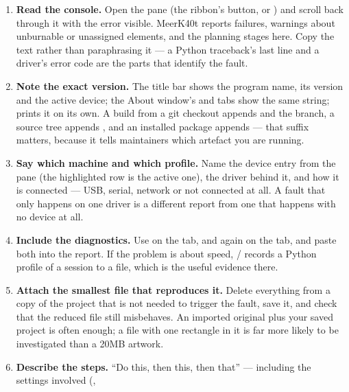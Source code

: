 \begin{enumerate}[label=\arabic*.,leftmargin=1.6em]
  \item \textbf{Read the console.} Open the  pane (the ribbon's
         button, or ) and scroll back through it
        with the error visible.
        MeerK40t reports failures, warnings about unburnable or unassigned
        elements, and the planning stages here. Copy the text rather than
        paraphrasing it --- a Python traceback's last line and a driver's error
        code are the parts that identify the fault.
  \item \textbf{Note the exact version.} The title bar shows the program name,
        its version and the active device; the About window's
         and  tabs show the same
        string;  prints it on its own. A build from a git
        checkout appends  and the branch, a source tree appends
        , and an installed package appends  --- that suffix
        matters, because it tells maintainers which artefact you are running.
  \item \textbf{Say which machine and which profile.} Name the device entry from
        the  pane (the highlighted row is the active one), the
        driver behind it, and how it is connected --- USB, serial, network or
        not connected at all. A fault that only happens on one driver is a
        different report from one that happens with no device at all.
  \item \textbf{Include the diagnostics.} Use  on the
         tab, and again on the
         tab, and paste both into the report. If
        the problem is about speed, / records a Python
        profile of a session to a file, which is the useful evidence there.
  \item \textbf{Attach the smallest file that reproduces it.} Delete everything
        from a copy of the project that is not needed to trigger the fault, save
        it, and check that the reduced file still misbehaves. An imported
        original plus your saved project is often enough; a file with one
        rectangle in it is far more likely to be investigated than a
        20\unit{MB} artwork.
  \item \textbf{Describe the steps.} ``Do this, then this, then that'' ---
        including the settings involved (,

\end{enumerate}
